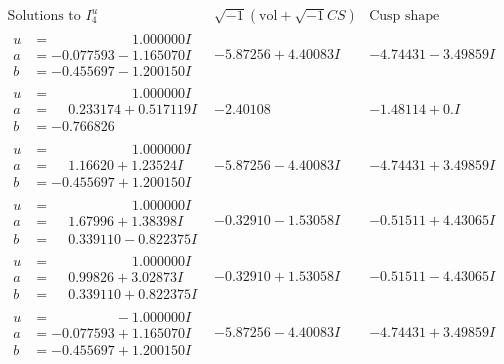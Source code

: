 \documentclass[1p]{elsarticle_modified}
\theoremstyle{definition}
\newcommand{\I}{\sqrt{-1}}
\begin{document}
$$\begin{array}{c|c|c}  
\text{Solutions to }I^u_{4}& \I (\text{vol} + \sqrt{-1}CS) & \text{Cusp shape}\\
 \hline 
\begin{aligned}
u &= \phantom{-0.000000 -}1.000000 I \\
a &= -0.077593 - 1.165070 I \\
b &= -0.455697 - 1.200150 I\end{aligned}
 & -5.87256 + 4.40083 I & -4.74431 - 3.49859 I \\ \hline\begin{aligned}
u &= \phantom{-0.000000 -}1.000000 I \\
a &= \phantom{-}0.233174 + 0.517119 I \\
b &= -0.766826\phantom{ +0.000000I}\end{aligned}
 & -2.40108\phantom{ +0.000000I} & -1.48114 + 0. I\phantom{ +0.000000I} \\ \hline\begin{aligned}
u &= \phantom{-0.000000 -}1.000000 I \\
a &= \phantom{-}1.16620 + 1.23524 I \\
b &= -0.455697 + 1.200150 I\end{aligned}
 & -5.87256 - 4.40083 I & -4.74431 + 3.49859 I \\ \hline\begin{aligned}
u &= \phantom{-0.000000 -}1.000000 I \\
a &= \phantom{-}1.67996 + 1.38398 I \\
b &= \phantom{-}0.339110 - 0.822375 I\end{aligned}
 & -0.32910 - 1.53058 I & -0.51511 + 4.43065 I \\ \hline\begin{aligned}
u &= \phantom{-0.000000 -}1.000000 I \\
a &= \phantom{-}0.99826 + 3.02873 I \\
b &= \phantom{-}0.339110 + 0.822375 I\end{aligned}
 & -0.32910 + 1.53058 I & -0.51511 - 4.43065 I \\ \hline\begin{aligned}
u &= \phantom{-0.000000 } -1.000000 I \\
a &= -0.077593 + 1.165070 I \\
b &= -0.455697 + 1.200150 I\end{aligned}
 & -5.87256 - 4.40083 I & -4.74431 + 3.49859 I \\ \hline\begin{aligned}

\end{aligned}
\end{array}$$
\end{document}
